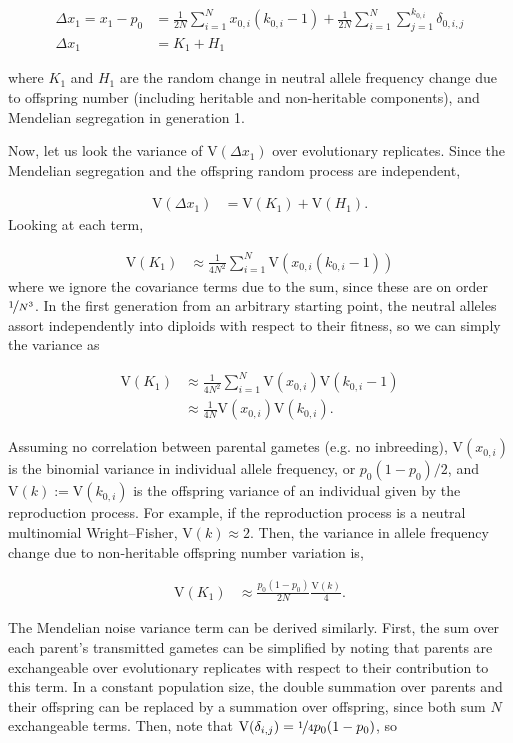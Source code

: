 \documentclass[11pt]{article}
\newcommand{\V}{\text{V}}
\newcommand{\V}{\text{V}}
\begin{document}
\begin{align}
  \Delta x_1 = x_1 - p_0 &= \frac{1}{2N} \sum_{i=1}^N x_{0,i} (k_{0,i} - 1) + \frac{1}{2N} \sum_{i=1}^N \sum_{j=1}^{k_{0,i}} \delta_{0,i,j} \nonumber \\
  \Delta x_1 &= K_1 + H_1
\end{align}

where $K_1$ and $H_1$ are the random change in neutral allele frequency change
due to offspring number (including heritable and non-heritable components), and
Mendelian segregation in generation 1.

Now, let us look the variance of $\V(\Delta x_1)$ over evolutionary
replicates. Since the Mendelian segregation and the offspring random process
are independent,

\begin{align}
  \V(\Delta x_1) &= \V(K_1) + \V(H_1).
\end{align}
%
Looking at each term,

\begin{align}
  \V(K_1) &\approx \frac{1}{4N^2} \sum_{i=1}^N \V\left(x_{0,i} (k_{0,i} - 1) \right)
\end{align}
%
where we ignore the covariance terms due to the sum, since these are on order
$\nicefrac{1}{N^3}$. In the first generation from an arbitrary starting point,
the neutral alleles assort independently into diploids with respect to their
fitness, so we can simply the variance as

\begin{align}
  \V(K_1) &\approx \frac{1}{4N^2} \sum_{i=1}^N \V(x_{0,i}) \V(k_{0,i} - 1) \nonumber  \\
            &\approx \frac{1}{4N} \V(x_{0,i}) \V(k_{0,i}).
\end{align}

Assuming no correlation between parental gametes (e.g. no inbreeding),
$\V(x_{0,i})$ is the binomial variance in individual allele frequency, or
$p_0(1-p_0)/2$, and $\V(k) := \V(k_{0,i})$ is the offspring variance of an
individual given by the reproduction process. For example, if the reproduction
process is a neutral multinomial Wright--Fisher, $\V(k) \approx 2$. Then, the
variance in allele frequency change due to non-heritable offspring number
variation is,

\begin{align}
  \V(K_1) &\approx \frac{p_0(1-p_0)}{2N} \frac{\V(k)}{4}.
\end{align}

The Mendelian noise variance term can be derived similarly. First, the sum over
each parent's transmitted gametes can be simplified by noting that parents are
exchangeable over evolutionary replicates with respect to their contribution to
this term. In a constant population size, the double summation over parents and
their offspring can be replaced by a summation over offspring, since both sum
$N$ exchangeable terms. Then, note that $\V(\delta_{i,j}) = \nicefrac{1}{4}
p_0(1-p_0)$, so
\end{document}
